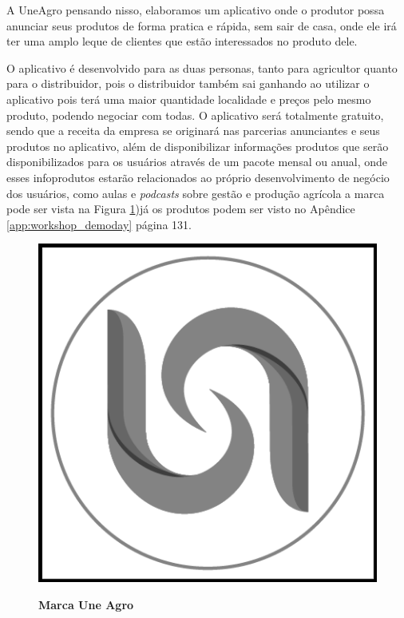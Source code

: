 A UneAgro pensando nisso, elaboramos um aplicativo onde o produtor possa anunciar seus produtos de forma pratica e rápida, sem sair de casa, onde ele irá ter uma amplo leque de clientes que estão interessados no produto dele.

O aplicativo é desenvolvido para as duas personas, tanto para agricultor quanto para o distribuidor, pois o distribuidor também sai ganhando ao utilizar o aplicativo pois terá uma maior quantidade localidade e preços pelo mesmo produto, podendo negociar com todas. O aplicativo será totalmente gratuito, sendo que a receita da empresa se originará nas parcerias anunciantes e seus produtos no aplicativo, além de disponibilizar informações produtos que serão disponibilizados para os usuários através de um pacote mensal ou anual, onde esses infoprodutos estarão relacionados ao próprio desenvolvimento de negócio dos usuários, como aulas e \textit{podcasts} sobre gestão e produção agrícola a marca pode ser vista na Figura \ref{figura_28})já os produtos podem ser visto no Apêndice \ref{app:workshop_demoday} página 131.

\begin{figure}[H]
\centering
\caption{\textbf{Marca Une Agro}}
\includegraphics[scale=0.35]{Imagens/uneagro.png}
\label{figura_28}
\end{figure}


